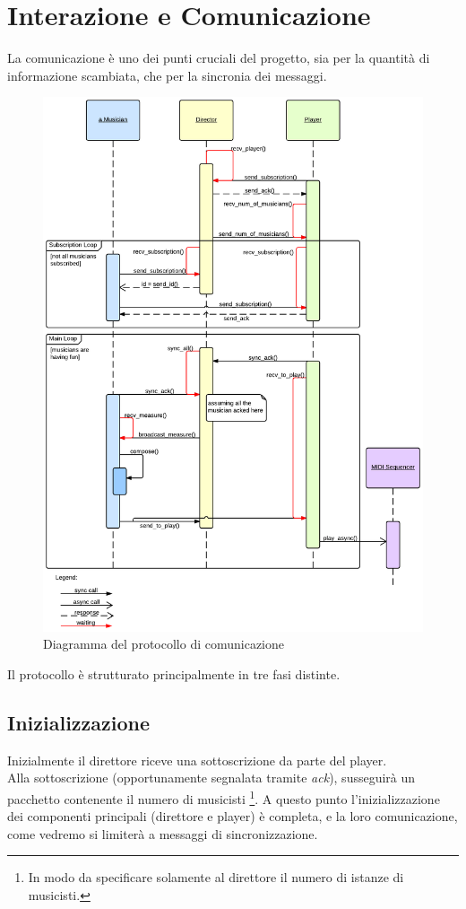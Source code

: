 \section{Interazione e Comunicazione}
La comunicazione è uno dei punti cruciali del progetto,
sia per la quantità di informazione scambiata,
che per la sincronia dei messaggi.

\begin{figure}[H]
\centering
\includegraphics[scale=0.6]{img/protocol.png}
\caption{Diagramma del protocollo di comunicazione}
\end{figure}

Il protocollo è strutturato principalmente in tre fasi distinte.

\subsection{Inizializzazione}
Inizialmente il direttore riceve una sottoscrizione da parte del player.\\
Alla sottoscrizione (opportunamente segnalata tramite \emph{ack}), susseguirà un
pacchetto contenente il numero di musicisti
\footnote{In modo da specificare solamente al direttore
	  il numero di istanze di musicisti.}.
A questo punto l'inizializzazione dei componenti principali
(direttore e player) è completa, e la loro comunicazione, come vedremo
si limiterà a messaggi di sincronizzazione.

